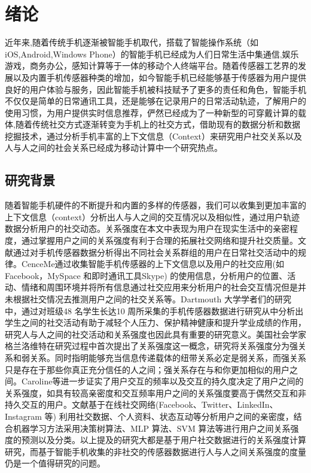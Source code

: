 \chapter{绪论}
近年来,随着传统手机逐渐被智能手机取代，搭载了智能操作系统（如iOS,Android,Windows Phone）的智能手机已经成为人们日常生活中集通信,娱乐游戏，商务办公，感知计算等于一体的移动个人终端平台。随着传感器工艺界的发展以及内置手机传感器种类的增加，如今智能手机已经能够基于传感器为用户提供良好的用户体验与服务，因此智能手机被科技赋予了更多的责任和角色，智能手机不仅仅是简单的日常通讯工具，还是能够在记录用户的日常活动轨迹，了解用户的使用习惯，为用户提供实时信息推荐，俨然已经成为了一种新型的可穿戴计算的载体,随着传统社交方式逐渐转变为手机上的社交方式，借助现有的数据分析和数据挖掘技术，通过分析手机丰富的上下文信息（Context）来研究用户社交关系以及人与人之间的社会关系已经成为移动计算中一个研究热点。

\section{研究背景}

随着智能手机硬件的不断提升和内置的多样的传感器，我们可以收集到更加丰富的上下文信息（context）分析出人与人之间的交互情况以及相似性，通过用户轨迹数据分析用户的社交动态。关系强度在本文中表现为用户在现实生活中的亲密程度，通过掌握用户之间的关系强度有利于合理的拓展社交网络和提升社交质量。文献\cite{eagle2006reality}通过对手机传感器数据分析得出不同社会关系群组的用户在日常社交活动中的规律。CenceMe通过收集智能手机传感器的上下文信息以及用户的社交应用(如Facebook，MySpace 和即时通讯工具Skype) 的使用信息，分析用户的位置、活动、情绪和周围环境并将所有信息通过社交应用来分析用户的社会交互情况但是并未根据社交情况去推测用户之间的社交关系等。Dartmouth 大学学者们的研究中，通过对班级48 名学生长达10 周所采集的手机传感器数据进行研究从中分析出学生之间的社交活动有助于减轻个人压力、保护精神健康和提升学业成绩的作用，研究人与人之间的社交活动和关系强度也因此具有重要的研究意义。美国社会学家格兰洛维特在研究过程中首次提出了关系强度这一概念，研究将关系强度分为强关系和弱关系。同时指明能够充当信息传递载体的纽带关系必定是弱关系，而强关系只是存在于那些你真正充分信任的人之间；强关系存在与和你更加相似的用户之间。Caroline等进一步证实了用户交互的频率以及交互的持久度决定了用户之间的关系强度，如具有较高亲密度和交互频率用户之间的关系强度要高于偶然交互和非持久交互的用户。文献\cite{gustafson2012extracting,khadangi2013measuring,zhao2012relationship}基于在线社交网络(Facebook、Twitter、LinkedIn、Instagram 等) 利用社交数据、个人资料、状态互动等分析用户之间的亲密度，结合机器学习方法采用决策树算法、MLP 算法、SVM 算法等进行用户之间关系强度的预测以及分类。以上提及的研究大都是基于用户社交数据进行的关系强度计算研究，而基于智能手机收集的非社交的传感器数据进行人与人之间关系强度的度量仍是一个值得研究的问题。

